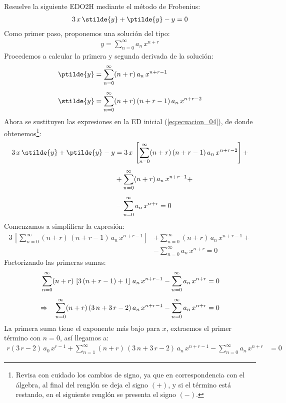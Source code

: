 Resuelve la siguiente EDO2H mediante el método de Frobenius:
\begin{align}
3 \, x \, \stilde{y} + \ptilde{y} - y = 0
\label{eq:ecuacion_04}    
\end{align}
Como primer paso, proponemos una solución del tipo:
\begin{align*}
y = \sum_{n=0}^{\infty} a_{n} \, x^{n+r}
\end{align*}
Procedemos a calcular la primera y segunda derivada de la solución:
\begin{align*}
\ptilde{y} &= \sum_{n=0}^{\infty} (n + r) \, a_{n} \, x^{n+r-1} \\[0.5em]
\stilde{y} &= \sum_{n=0}^{\infty} (n + r) \, (n + r - 1) \, a_{n} \, x^{n+r-2}
\end{align*}
Ahora se sustituyen las expresiones en la ED inicial (\ref{eq:ecuacion_04}), de donde obtenemos\footnote{Revisa con cuidado los cambios de signo, ya que en correspondencia con el álgebra, al final del renglón se deja el signo $(+)$, y si el término está restando, en el siguiente renglón se presenta el signo $(-)$.}:
\begin{align*}
3 \, x \, \stilde{y} + \ptilde{y} - y &= 3 \, x \, \left[  \sum_{n=0}^{\infty} (n + r) \, (n + r - 1) \, a_{n} \, x^{n+r-2} \right] + \\[0.5em]
&+ \sum_{n=0}^{\infty} (n + r) \, a_{n} \, x^{n+r-1} + \\[0.5em]
&- \sum_{n=0}^{\infty} a_{n} \, x^{n+r} = 0
\end{align*}
Comenzamos a simplificar la expresión:
\begin{align*}
3 \, \left[  \sum_{n=0}^{\infty} (n + r) \, (n + r - 1) \, a_{n} \, x^{n+r-1} \right] &+ \sum_{n=0}^{\infty} (n + r) \, a_{n} \, x^{n+r-1} + \\[0.5em]
&- \sum_{n=0}^{\infty} a_{n} \, x^{n+r} = 0
\end{align*}
Factorizando las primeras sumas:
\begin{align*}
\sum_{n=0}^{\infty} (n + r) \, \left[ 3 \, (n + r - 1) + 1 \right] \, a_{n} \, x^{n+r-1} - \sum_{n=0}^{\infty} a_{n} \, x^{n+r} &= 0 \\[0.5em] 
\Rightarrow \hspace{0.3cm} \sum_{n=0}^{\infty} (n + r) \, (3 \, n + 3 \, r - 2) \, a_{n} \, x^{n+r-1} - \sum_{n=0}^{\infty} a_{n} \, x^{n+r} &= 0
\end{align*}
La primera suma tiene el exponente más bajo para $x$, extraemos el primer término con $n = 0$, así llegamos a:
\begin{align*}
r( 3 \, r - 2) \, a_{0} \, x^{r-1} + \sum_{n=1}^{\infty} (n + r) \, (3 \, n + 3 \, r - 2) \, a_{n} \, x^{n+r-1} - \sum_{n=0}^{\infty} a_{n} \, x^{n+r} &= 0
\end{align*}
